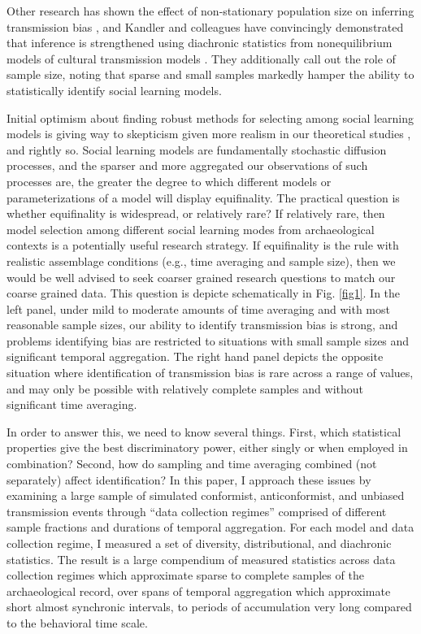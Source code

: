 \documentclass[10pt,letterpaper]{article}
\begin{document}
Other research has shown the effect of non-stationary population size on inferring transmission bias \cite{Rorabaugh:2014fl}, and Kandler and colleagues have convincingly demonstrated that inference is strengthened using diachronic statistics from nonequilibrium models of cultural transmission models \cite{kandler2013non, wilderkandler2015}.  They \cite{wilderkandler2015} additionally call out the role of sample size, noting that sparse and small samples markedly hamper the ability to statistically identify social learning models.  

Initial optimism about finding robust methods for selecting among social learning models is giving way to skepticism given more realism in our theoretical studies , and rightly so.  Social learning models are fundamentally stochastic diffusion processes, and the sparser and more aggregated our observations of such processes are, the greater the degree to which different models or parameterizations of a model will display equifinality.  The practical question is whether equifinality is widespread, or relatively rare?  If relatively rare, then model selection among different social learning modes from archaeological contexts is a potentially useful research strategy.  If equifinality is the rule with realistic assemblage conditions (e.g., time averaging and sample size), then we would be well advised to seek coarser grained research questions to match our coarse grained data.  This question is depicte schematically in Fig. \ref{fig1}.  In the left panel, under mild to moderate amounts of time averaging and with most reasonable sample sizes, our ability to identify transmission bias is strong, and problems identifying bias are restricted to situations with small sample sizes and significant temporal aggregation.  The right hand panel depicts the opposite situation where identification of transmission bias is rare across a range of values, and may only be possible with relatively complete samples and without significant time averaging.  






In order to answer this, we need to know several things.  First, which statistical properties give the best discriminatory power, either singly or when employed in combination?  Second, how do sampling and time averaging combined (not separately) affect identification?  In this paper, I approach these issues by examining a large sample of simulated conformist, anticonformist, and unbiased transmission events through ``data collection regimes'' comprised of different sample fractions and durations of temporal aggregation.  For each model and data collection regime, I measured a set of diversity, distributional, and diachronic statistics.  The result is a large compendium of measured statistics across data collection regimes which approximate sparse to complete samples of the archaeological record, over spans of temporal aggregation which approximate short almost synchronic intervals, to periods of accumulation very long compared to the behavioral time scale.  
\end{document}
